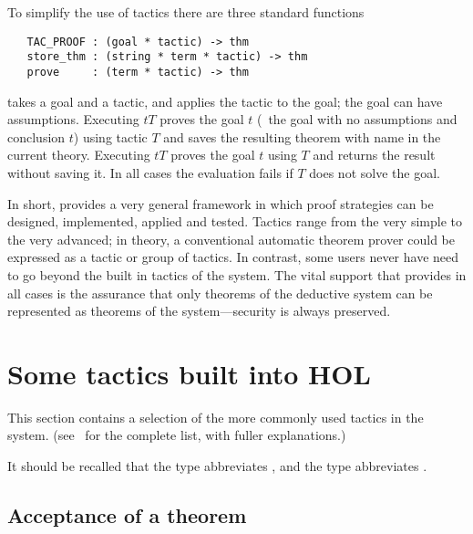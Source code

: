 To simplify the use of tactics there are three standard functions

\begin{boxed}\begin{verbatim}
   TAC_PROOF : (goal * tactic) -> thm
   store_thm : (string * term * tactic) -> thm
   prove     : (term * tactic) -> thm
\end{verbatim}\end{boxed}

\noindent {} takes a goal and a tactic, and applies the
tactic to the goal; the goal can have assumptions.  Executing
$t$\ml{,}$T$\ml{)} proves the goal
\ml{([],}$t$\ml{)} (\ie\ the goal with no assumptions and conclusion
$t$) using tactic $T$ and saves the resulting theorem with name
 in the current theory.  Executing
$t$\ml{,}$T$\ml{)} proves the goal \ml{([],}$t$\ml{)} using
$T$ and returns the result without saving it. In all cases the
evaluation fails if $T$ does not solve the goal.

In short, \HOL{} provides a very general framework in which proof
strategies can be designed, implemented, applied and tested.  Tactics
range from the very simple to the very advanced; in theory, a
conventional automatic theorem prover could be expressed as a tactic or group
of tactics.  In contrast, some users never have need to go beyond the
built in tactics of the system.  The vital support that \HOL{} provides
in all cases is the assurance that only theorems of the deductive system
can be represented as theorems of the \HOL{} system---security is
always preserved.

\section{Some tactics built into HOL}
\label{avra_builtin}

This section contains a selection of the more commonly
used tactics in the \HOL{} system. (see \REFERENCE\
for the complete list, with fuller explanations.)

It should be recalled that the \ML{} type  abbreviates
\ml{thm->tactic}, and the type \ml{conv} abbreviates \ml{term->thm}.

\subsection{Acceptance of a theorem}


